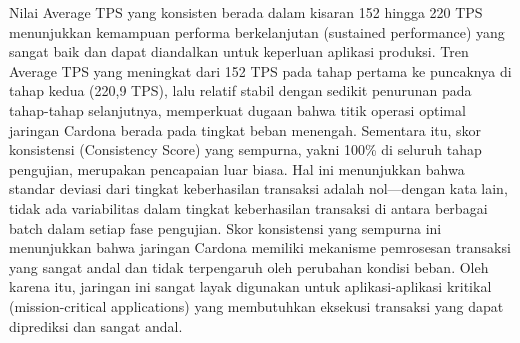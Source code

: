 Nilai Average TPS yang konsisten berada dalam kisaran 152 hingga 220 TPS
menunjukkan kemampuan performa berkelanjutan (sustained performance) yang
sangat baik dan dapat diandalkan untuk keperluan aplikasi produksi. Tren
Average TPS yang meningkat dari 152 TPS pada tahap pertama ke puncaknya di
tahap kedua (220,9 TPS), lalu relatif stabil dengan sedikit penurunan pada
tahap-tahap selanjutnya, memperkuat dugaan bahwa titik operasi optimal jaringan
Cardona berada pada tingkat beban menengah. Sementara itu, skor konsistensi
(Consistency Score) yang sempurna, yakni 100\% di seluruh tahap pengujian,
merupakan pencapaian luar biasa. Hal ini menunjukkan bahwa standar deviasi dari
tingkat keberhasilan transaksi adalah nol—dengan kata lain, tidak ada
variabilitas dalam tingkat keberhasilan transaksi di antara berbagai batch
dalam setiap fase pengujian. Skor konsistensi yang sempurna ini menunjukkan
bahwa jaringan Cardona memiliki mekanisme pemrosesan transaksi yang sangat
andal dan tidak terpengaruh oleh perubahan kondisi beban. Oleh karena itu,
jaringan ini sangat layak digunakan untuk aplikasi-aplikasi kritikal
(mission-critical applications) yang membutuhkan eksekusi transaksi yang dapat
diprediksi dan sangat andal.

